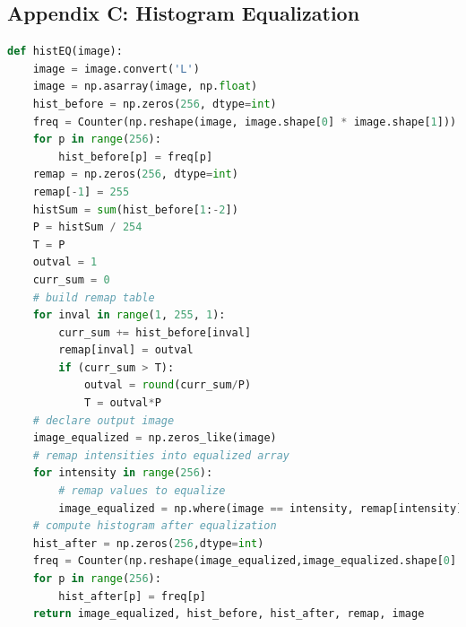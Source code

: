 \documentclass[11pt,a4paper]{article}
\begin{document}
\subsection{Appendix C: Histogram Equalization}
	\begin{lstlisting}[language=Python,label={lst:hist}]
def histEQ(image):
    image = image.convert('L')
    image = np.asarray(image, np.float)
    hist_before = np.zeros(256, dtype=int)
    freq = Counter(np.reshape(image, image.shape[0] * image.shape[1]))
    for p in range(256):
        hist_before[p] = freq[p]
    remap = np.zeros(256, dtype=int)
    remap[-1] = 255
    histSum = sum(hist_before[1:-2])
    P = histSum / 254
    T = P
    outval = 1
    curr_sum = 0
    # build remap table
    for inval in range(1, 255, 1):
        curr_sum += hist_before[inval]
        remap[inval] = outval
        if (curr_sum > T):
            outval = round(curr_sum/P)
            T = outval*P
    # declare output image
    image_equalized = np.zeros_like(image)
    # remap intensities into equalized array
    for intensity in range(256):
        # remap values to equalize
        image_equalized = np.where(image == intensity, remap[intensity], image_equalized)
    # compute histogram after equalization
    hist_after = np.zeros(256,dtype=int)
    freq = Counter(np.reshape(image_equalized,image_equalized.shape[0] * image_equalized.shape[1]))
    for p in range(256):
        hist_after[p] = freq[p]
    return image_equalized, hist_before, hist_after, remap, image
    \end{lstlisting}
\end{document}
